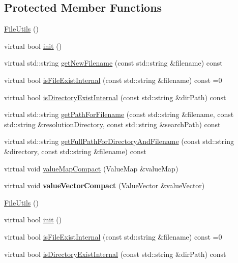 \subsection*{Protected Member Functions}
\begin{DoxyCompactItemize}
\item 
\hyperlink{classFileUtils_abb87f1bbabb1164634e428aee3559b10}{File\+Utils} ()
\item 
virtual bool \hyperlink{classFileUtils_a2c891e99dc7af7343f4f9e8d4798a563}{init} ()
\item 
virtual std\+::string \hyperlink{classFileUtils_a71e6d271830df5ba7484c69928c40f5a}{get\+New\+Filename} (const std\+::string \&filename) const
\item 
virtual bool \hyperlink{classFileUtils_a0e1dc78cbe5ac5689e1f67ebd4413bab}{is\+File\+Exist\+Internal} (const std\+::string \&filename) const =0
\item 
virtual bool \hyperlink{classFileUtils_a6f2a350e8f2b15219637b40bed4c38ec}{is\+Directory\+Exist\+Internal} (const std\+::string \&dir\+Path) const
\item 
virtual std\+::string \hyperlink{classFileUtils_ae575880a693de746f1505be83c6b4bfa}{get\+Path\+For\+Filename} (const std\+::string \&filename, const std\+::string \&resolution\+Directory, const std\+::string \&search\+Path) const
\item 
virtual std\+::string \hyperlink{classFileUtils_a543d684dc27fc7d02fbe387271d92c12}{get\+Full\+Path\+For\+Directory\+And\+Filename} (const std\+::string \&directory, const std\+::string \&filename) const
\item 
virtual void \hyperlink{classFileUtils_a294123a0e04d6556c1de05c23696ce1b}{value\+Map\+Compact} (Value\+Map \&value\+Map)
\item 
\mbox{\label{classFileUtils_ad55974a40d238599fb509afe2bfeaf54}} 
virtual void {\bfseries value\+Vector\+Compact} (Value\+Vector \&value\+Vector)
\item 
\hyperlink{classFileUtils_abb87f1bbabb1164634e428aee3559b10}{File\+Utils} ()
\item 
virtual bool \hyperlink{classFileUtils_aff29da112f10057767427bdb6eb747c3}{init} ()
\item 
virtual bool \hyperlink{classFileUtils_a0e1dc78cbe5ac5689e1f67ebd4413bab}{is\+File\+Exist\+Internal} (const std\+::string \&filename) const =0
\item 
virtual bool \hyperlink{classFileUtils_a4fff89e80712f3767f423fe31d78fcaa}{is\+Directory\+Exist\+Internal} (const std\+::string \&dir\+Path) const

\end{DoxyCompactItemize}
